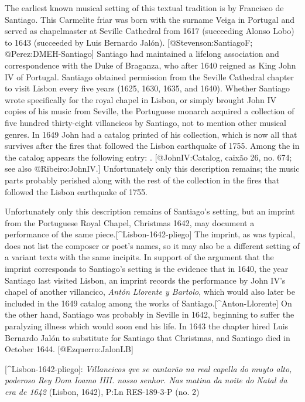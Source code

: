The earliest known musical setting of this textual tradition is by Francisco de
Santiago.
This Carmelite friar was born with the surname Veiga in Portugal and
served as chapelmaster at Seville Cathedral from 1617 (succeeding Alonso Lobo)
to 1643 (succeeded by Luis Bernardo Jalón).
[@Stevenson:SantiagoF; @Perez:DMEH-Santiago]
Santiago had maintained a lifelong association and correspondence with the Duke
of Braganza, who after 1640 reigned as King John IV of Portugal.
Santiago obtained permission from the Seville Cathedral chapter to visit Lisbon
every five years (1625, 1630, 1635, and 1640).
Whether Santiago wrote specifically for the royal chapel in Lisbon, or
simply brought John IV copies of his music from Seville, the Portuguese monarch
acquired a collection of five hundred thirty-eight villancicos by Santiago, not
to mention other musical genres.
In 1649 John had a catalog printed of his collection, which is now all that
survives after the fires that followed the Lisbon earthquake of 1755.
Among the  in the catalog
appears the following entry:
. 
[@JohnIV:Catalog, caixão 26, no. 674; see also @Ribeiro:JohnIV.]
Unfortunately only this description remains; the music parts probably perished
along with the rest of the collection in the fires that followed the Lisbon
earthquake of 1755.

Unfortunately only this description remains of Santiago's setting, but an
imprint from the Portuguese Royal Chapel, Christmas 1642, may document a
performance of the same piece.[^Lisbon-1642-pliego] 
The imprint, as was typical, does not list the composer or poet's names, so it
may also be a different setting of a variant texts with the same incipits.
In support of the argument that the imprint corresponds to Santiago's setting is
the evidence that in 1640, the year Santiago last visited Lisbon, an imprint
records the performance by John IV's chapel of another villancico, \emph{Antón
Llorente y Bartolo}, which would also later be included in the 1649 catalog
among the works of Santiago.[^Anton-Llorente]
On the other hand, Santiago was probably in Seville in 1642, beginning to suffer
the paralyzing illness which would soon end his life.
In 1643 the chapter hired Luis Bernardo Jalón to substitute for Santiago that
Christmas, and Santiago died in October 1644.
[@Ezquerro:JalonLB]

[^Lisbon-1642-pliego]:
\emph{Villancicos qve se cantarão na real capella do muyto alto, \et{} poderoso Rey Dom
Ioamo IIII. nosso senhor. Nas matina da noite do Natal da era de 1642} (Lisbon,
1642), P:Ln RES-189-3-P (no. 2)

